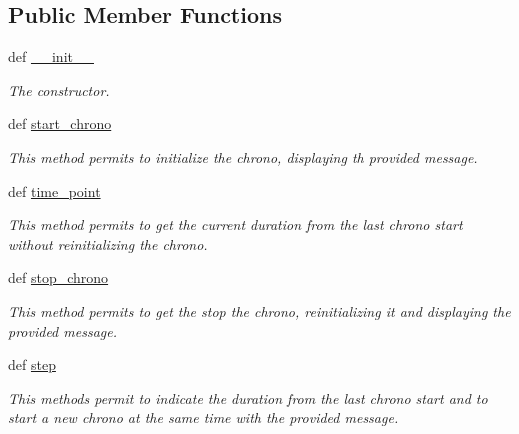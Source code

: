 \subsection*{Public Member Functions}
\begin{DoxyCompactItemize}
\item 
\hypertarget{classsrc_1_1core_1_1util_1_1time_1_1Timer_1_1Timer_ae35590f78d4e96d11516946bab60e93e}{def \hyperlink{classsrc_1_1core_1_1util_1_1time_1_1Timer_1_1Timer_ae35590f78d4e96d11516946bab60e93e}{\-\_\-\-\_\-init\-\_\-\-\_\-}}\label{classsrc_1_1core_1_1util_1_1time_1_1Timer_1_1Timer_ae35590f78d4e96d11516946bab60e93e}

\begin{DoxyCompactList}\small\item\em The constructor. \end{DoxyCompactList}\item 
def \hyperlink{classsrc_1_1core_1_1util_1_1time_1_1Timer_1_1Timer_a76388d0aedb0f14c3f00e83e25b60113}{start\-\_\-chrono}
\begin{DoxyCompactList}\small\item\em This method permits to initialize the chrono, displaying th provided message. \end{DoxyCompactList}\item 
\hypertarget{classsrc_1_1core_1_1util_1_1time_1_1Timer_1_1Timer_a2f7caa405d211209d56328384676739d}{def \hyperlink{classsrc_1_1core_1_1util_1_1time_1_1Timer_1_1Timer_a2f7caa405d211209d56328384676739d}{time\-\_\-point}}\label{classsrc_1_1core_1_1util_1_1time_1_1Timer_1_1Timer_a2f7caa405d211209d56328384676739d}

\begin{DoxyCompactList}\small\item\em This method permits to get the current duration from the last chrono start without reinitializing the chrono. \end{DoxyCompactList}\item 
def \hyperlink{classsrc_1_1core_1_1util_1_1time_1_1Timer_1_1Timer_aa90849538b0dbe6a2a4763912bc7b532}{stop\-\_\-chrono}
\begin{DoxyCompactList}\small\item\em This method permits to get the stop the chrono, reinitializing it and displaying the provided message. \end{DoxyCompactList}\item 
def \hyperlink{classsrc_1_1core_1_1util_1_1time_1_1Timer_1_1Timer_a0d55b8d5ed3f6f72f3d26e91b715caa5}{step}
\begin{DoxyCompactList}\small\item\em This methods permit to indicate the duration from the last chrono start and to start a new chrono at the same time with the provided message. \end{DoxyCompactList}\end{DoxyCompactItemize}
